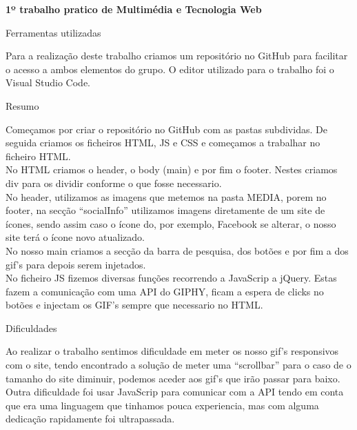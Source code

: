 \documentclass[11pt]{article}
\begin{document}

 \Large\textbf{1º trabalho pratico  de Multimédia e Tecnologia Web }
\linebreak


\Large{Ferramentas utilizadas}
\normalsize 

\vspace{4mm}
    	Para a realização deste trabalho criamos um repositório no GitHub  para facilitar o acesso a ambos elementos do grupo. O editor utilizado para o trabalho foi o Visual Studio Code.

\vspace{4mm}
\Large{Resumo}
\normalsize 

\vspace{4mm}
Começamos por criar o repositório no GitHub com as pastas subdividas. De seguida criamos os ficheiros HTML, JS e CSS e começamos a trabalhar no ficheiro HTML. \\

No HTML criamos o header, o body (main) e por fim o footer. Nestes criamos div para os dividir conforme o que fosse necessario. \\

No header, utilizamos as imagens que metemos na pasta MEDIA, porem no footer, na secção “socialInfo” utilizamos imagens diretamente de um site de ícones, sendo assim caso o ícone do, por exemplo, Facebook se alterar, o nosso site terá o ícone novo atualizado. \\

No nosso main criamos a secção da barra de pesquisa, dos botões e por fim a dos gif’s para depois serem injetados.\\

No ficheiro JS fizemos diversas funções recorrendo a JavaScrip a jQuery. Estas fazem a comunicação com uma API do GIPHY, ficam a espera de clicks no botões e injectam os GIF's sempre que necessario no HTML.


\vspace{4mm}
\Large{Dificuldades}
\normalsize 

\vspace{4mm}
Ao realizar o trabalho sentimos dificuldade em meter os nosso gif’s responsivos com o site, tendo encontrado a solução de meter uma “scrollbar” para o caso de o tamanho do site diminuir, podemos aceder aos gif’s que irão passar para baixo.\\

Outra dificuldade foi usar JavaScrip para comunicar com a API tendo em conta que era uma linguagem que tinhamos pouca experiencia,  mas com alguma dedicação rapidamente foi ultrapassada.
\end{document}
